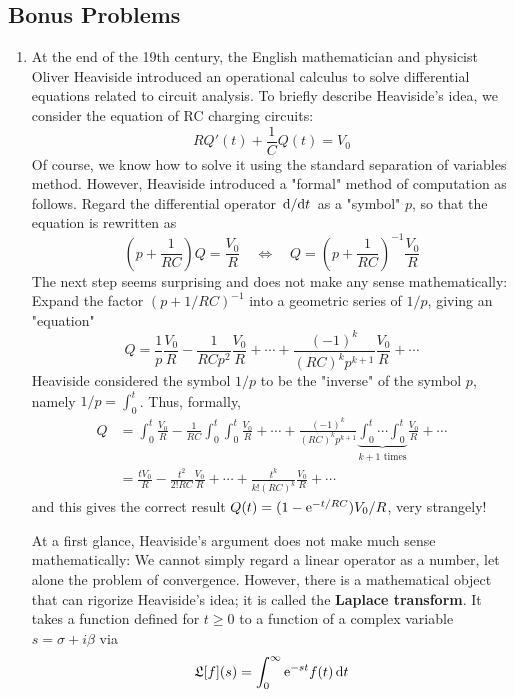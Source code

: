 \documentclass[../psets.tex]{subfiles}
\begin{document}
\subsection*{Bonus Problems}
\begin{enumerate}
    \item At the end of the 19th century, the English mathematician and physicist Oliver Heaviside introduced an operational calculus to solve differential equations related to circuit analysis. To briefly describe Heaviside's idea, we consider the equation of RC charging circuits:
    \begin{equation*}
        RQ'(t)+\frac{1}{C}Q(t) = V_0
    \end{equation*}
    Of course, we know how to solve it using the standard separation of variables method. However, Heaviside introduced a "formal" method of computation as follows. Regard the differential operator $\dv*{t}$ as a "symbol" $p$, so that the equation is rewritten as
    \begin{equation*}
        \left( p+\frac{1}{RC} \right)Q = \frac{V_0}{R}
        \quad\Longleftrightarrow\quad
        Q = \left( p+\frac{1}{RC} \right)^{-1}\frac{V_0}{R}
    \end{equation*}
    The next step seems surprising and does not make any sense mathematically: Expand the factor $(p+1/RC)^{-1}$ into a geometric series of $1/p$, giving an "equation"
    \begin{equation*}
        Q = \frac{1}{p}\frac{V_0}{R}-\frac{1}{RCp^2}\frac{V_0}{R}+\cdots+\frac{(-1)^k}{(RC)^kp^{k+1}}\frac{V_0}{R}+\cdots
    \end{equation*}
    Heaviside considered the symbol $1/p$ to be the "inverse" of the symbol $p$, namely $1/p=\int_0^t$. Thus, formally,
    \begin{align*}
        Q &= \int_0^t\frac{V_0}{R}-\frac{1}{RC}\int_0^t\int_0^t\frac{V_0}{R}+\cdots+\frac{(-1)^k}{(RC)^kp^{k+1}}\underbrace{\int_0^t\cdots\int_0^t}_{k+1\text{ times}}\frac{V_0}{R}+\cdots\\
        &= \frac{tV_0}{R}-\frac{t^2}{2!RC}\frac{V_0}{R}+\cdots+\frac{t^k}{k!(RC)^k}\frac{V_0}{R}+\cdots
    \end{align*}
    and this gives the correct result $Q(t)=(1-\e[-t/RC])V_0/R$, very strangely!\par
    At a first glance, Heaviside's argument does not make much sense mathematically: We cannot simply regard a linear operator as a number, let alone the problem of convergence. However, there is a mathematical object that can rigorize Heaviside's idea; it is called the \textbf{Laplace transform}. It takes a function defined for $t\geq 0$ to a function of a complex variable $s=\sigma+i\beta$ via
    \begin{equation*}
        \mathfrak{L}[f](s) = \int_0^\infty\e[-st]f(t)\dd{t}
    \end{equation*}
\end{enumerate}
\end{document}
